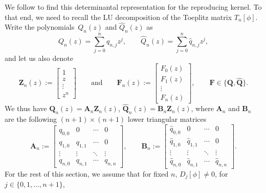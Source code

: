 \documentclass[10pt,a4paper]{amsart}
\numberwithin{equation}{section}
\newcommand{\qandq}{\qquad \text{and} \qquad}
\begin{document}
		We follow \cite{GW} to find this determinantal representation for the reproducing kernel. To that end, we need to recall the LU decomposition of the Toeplitz matrix $T_n[\phi]$. Write the polynomials~$Q_n(z)$ and $\widehat{Q}_n(z)$ as
		\begin{equation*}
			Q_n(z) = \sum_{j=0}^{n} q_{n,j} z^j, \qquad \widehat{Q}_n(z) = \sum_{j=0}^{n} \hat{q}_{n,j} z^j,
		\end{equation*}
		and let us also denote
		\begin{equation*}
			\boldsymbol{Z}_n(z) := \begin{bmatrix}
				1 \\ z \\ \vdots \\ z^{n}
			\end{bmatrix} \qandq \boldsymbol{F}_n(z) := \begin{bmatrix}
				F_0(z) \\ F_1(z) \\ \vdots \\ F_n(z)
			\end{bmatrix}, \qquad \boldsymbol{F} \in \big\{\boldsymbol{Q},\boldsymbol{\widehat{Q}}\big\}.
		\end{equation*}
		We thus have $\boldsymbol{Q}_n(z) = \boldsymbol{A}_{n} \boldsymbol{Z}_n(z)$, $\boldsymbol{\widehat{Q}}_n(z) = \boldsymbol{B}_{n} \boldsymbol{Z}_n(z)$,
		where $\boldsymbol{A}_{n}$ and $ \boldsymbol{B}_{n}$ are the following $(n+1)\times(n+1)$ lower triangular matrices
		\begin{equation}\label{An Bn}
			\boldsymbol{A}_{n} := \begin{bmatrix}
				q_{0,0} & 0 & \cdots & 0 \\
				q_{1,0} & q_{1,1} & \cdots & 0 \\
				\vdots & \vdots & \ddots & \vdots \\
				q_{n,0} & q_{n,1} & \cdots & q_{n,n}
			\end{bmatrix}, \qquad 	\boldsymbol{B}_{n} := \begin{bmatrix}
				\hat{q}_{0,0} & 0 & \cdots & 0 \\
				\hat{q}_{1,0} & \hat{q}_{1,1} & \cdots & 0 \\
				\vdots & \vdots & \ddots & \vdots \\
				\hat{q}_{n,0} & \hat{q}_{n,1} & \cdots & \hat{q}_{n,n}
			\end{bmatrix}.
		\end{equation}
		For the rest of this section, we assume that for fixed $n$, $D_j[\phi] \neq 0$, for $j \in\{0,1,\dots,n+1\}$,
\end{document}
